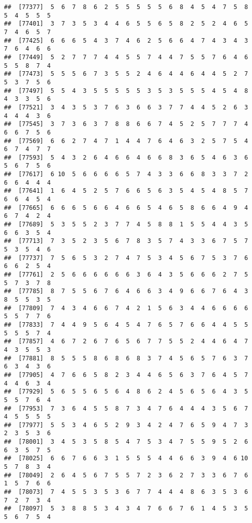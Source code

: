 \documentclass[
]{book}
\begin{document}
\begin{verbatim}
##  [77377]  5  6  7  8  6  2  5  5  5  5  5  6  8  4  5  4  7  5  8  5  4  5  5  5
##  [77401]  3  7  3  5  3  4  4  6  5  5  6  5  8  2  5  2  4  6  5  7  4  6  5  7
##  [77425]  6  6  6  5  4  3  7  4  6  2  5  6  6  4  7  4  3  4  3  7  6  4  6  6
##  [77449]  5  2  7  7  7  4  4  5  5  7  4  4  7  5  5  7  6  4  6  5  5  8  7  4
##  [77473]  5  5  5  6  7  3  5  5  2  4  6  4  4  6  4  4  5  2  7  5  3  7  5  6
##  [77497]  5  5  4  3  5  5  5  5  5  3  5  3  5  5  5  4  5  4  8  4  3  3  5  6
##  [77521]  3  4  3  5  3  7  6  3  6  6  3  7  7  4  4  5  2  6  3  4  4  4  3  6
##  [77545]  3  7  3  6  3  7  8  8  6  6  7  4  5  2  5  7  7  7  4  6  6  7  5  6
##  [77569]  6  6  2  7  4  7  1  4  4  7  6  4  6  3  2  5  7  5  4  6  7  4  7  7
##  [77593]  5  4  3  2  6  4  6  6  4  6  6  8  3  6  5  4  6  3  6  5  6  7  5  6
##  [77617]  6 10  5  6  6  6  6  5  7  4  3  3  6  6  8  3  3  7  2  6  6  4  4  4
##  [77641]  1  6  4  5  2  5  7  6  6  5  6  3  5  4  5  4  8  5  7  6  6  4  5  4
##  [77665]  6  6  6  5  6  6  4  6  6  5  4  6  5  8  6  6  4  9  4  6  7  4  2  4
##  [77689]  5  3  5  5  2  3  7  7  4  5  8  8  1  5  5  4  4  3  5  6  6  3  5  4
##  [77713]  7  3  5  2  3  5  6  7  8  3  5  7  4  3  3  6  7  5  7  5  3  5  4  6
##  [77737]  7  5  6  5  3  2  7  4  7  5  3  4  5  6  7  5  3  7  6  6  6  2  5  4
##  [77761]  2  5  6  6  6  6  6  6  3  6  4  3  5  6  6  6  2  7  5  5  7  3  7  8
##  [77785]  8  7  5  5  6  7  6  4  6  6  3  4  9  6  6  7  6  4  3  8  5  5  3  5
##  [77809]  7  4  3  4  6  6  7  4  2  1  5  6  3  4  4  6  6  6  6  5  5  7  7  6
##  [77833]  7  4  4  9  5  6  4  5  4  7  6  5  7  6  6  4  4  5  5  5  5  5  7  4
##  [77857]  4  6  7  2  6  7  6  5  6  7  7  5  5  2  4  4  6  4  7  4  3  5  5  3
##  [77881]  8  5  5  5  8  6  8  6  8  3  7  4  5  6  5  7  6  3  7  6  3  4  3  6
##  [77905]  4  7  6  6  5  8  2  3  4  4  6  5  6  3  7  6  4  5  7  4  4  6  3  4
##  [77929]  5  6  5  5  6  5  6  4  8  6  2  4  5  6  5  6  4  3  5  5  5  7  6  4
##  [77953]  7  3  6  4  5  5  8  7  3  4  7  6  4  4  4  3  5  6  7  4  5  5  5  5
##  [77977]  5  5  3  4  6  5  2  9  3  4  2  4  7  6  5  9  4  7  3  2  3  5  3  6
##  [78001]  3  4  5  3  5  8  5  4  7  5  3  4  7  5  5  9  5  2  6  6  3  5  7  5
##  [78025]  6  6  7  6  6  3  1  5  5  5  4  4  6  6  3  9  4  6 10  5  7  8  3  4
##  [78049]  2  6  4  5  6  7  5  5  7  2  3  6  2  7  3  3  6  7  6  1  5  7  6  6
##  [78073]  7  4  5  5  3  5  3  6  7  7  4  4  4  8  6  3  5  3  6  7  2  7  3  4
##  [78097]  5  3  8  8  5  3  4  3  4  7  6  6  7  6  1  4  5  3  5  5  6  7  5  4

\end{verbatim}
\end{document}
